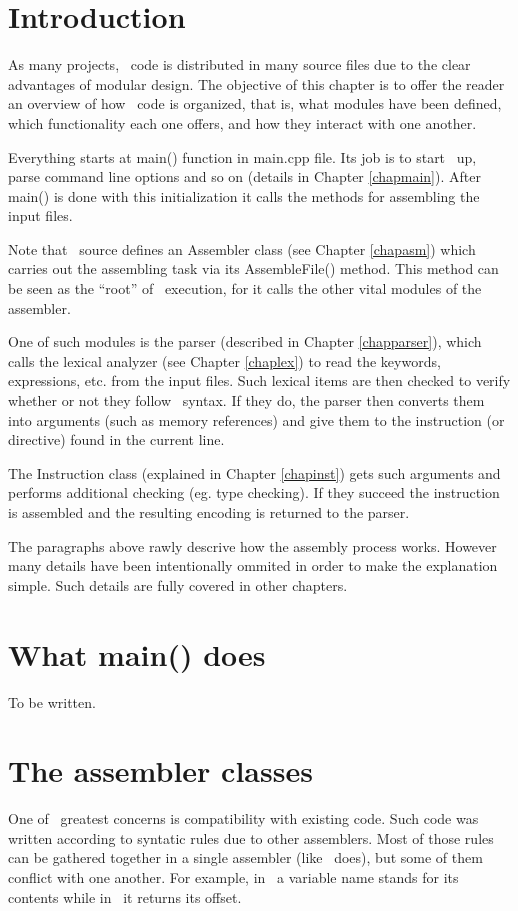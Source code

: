 \documentclass[a4paper,draft,12pt]{book}
\begin{document}
\chapter{Introduction}
As many projects, \popasm\ code is distributed in many source files
due to the clear advantages of modular design. The objective of this
chapter is to offer the reader an overview of how \popasm\ code is
organized, that is, what modules have been defined, which functionality
each one offers, and how they interact with one another.

Everything starts at main() function in main.cpp file. Its job is to
start \popasm\ up, parse command line options and so on (details in
Chapter \ref{chapmain}). After main() is done with this initialization
it calls the methods for assembling the input files.

Note that \popasm\ source defines an Assembler class (see Chapter
\ref{chapasm}) which carries out the assembling task via its
AssembleFile() method. This method can be seen as the ``root'' of
\popasm\ execution, for it calls the other vital modules of the
assembler.

One of such modules is the parser (described in Chapter \ref{chapparser}),
which calls the lexical analyzer (see Chapter \ref{chaplex}) to read
the keywords, expressions, etc. from the input files. Such lexical
items are then checked to verify whether or not they follow \popasm\ 
syntax. If they do, the parser then converts them into arguments
(such as memory references) and give them to the instruction (or
directive) found in the current line.

The Instruction class (explained in Chapter \ref{chapinst}) gets such
arguments and performs additional checking (eg. type checking). If
they succeed the instruction is assembled and the resulting encoding
is returned to the parser.

The paragraphs above rawly descrive how the assembly process works.
However many details have been intentionally ommited in order to
make the explanation simple. Such details are fully covered in other
chapters.

\chapter{What main() does\label{chapmain}}
To be written.

\chapter{The assembler classes\label{chapasm}}
One of \popasm\ greatest concerns is compatibility with existing code.
Such code was written according to syntatic rules due to other
assemblers. Most of those rules can be gathered together in a single
assembler (like \popasm\ does), but some of them conflict with one
another. For example, in \tasm\ a variable name stands for its contents
while in \nasm\ it returns its offset.
\end{document}
